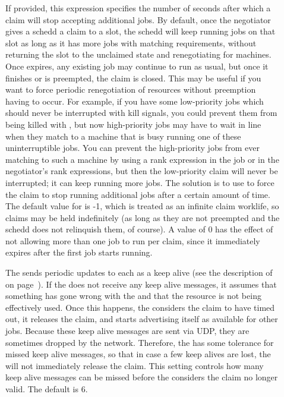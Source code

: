 \begin{description}
\item[] \label{param:ClaimWorklife} If
  provided, this expression specifies the number of seconds after
  which a claim will stop accepting additional jobs.  By default, once
  the negotiator gives a schedd a claim to a slot, the schedd will
  keep running jobs on that slot as long as it has more jobs with
  matching requirements, without returning the slot to the unclaimed
  state and renegotiating for machines.  Once 
  expires, any existing job may continue to run as usual, but once it
  finishes or is preempted, the claim is closed.
  This may be useful if you want to force periodic renegotiation of
  resources without preemption having to occur.  For example, if you
  have some low-priority jobs which should never be interrupted with
  kill signals, you could prevent them from being killed with
  , but now high-priority jobs may have to
  wait in line when they match to a machine that is busy running one of
  these uninterruptible jobs.  You can prevent the high-priority jobs
  from ever matching to such a machine by using a rank expression in the
  job or in the negotiator's rank expressions, but then the low-priority
  claim will never be interrupted; it can keep running more jobs.  The
  solution is to use  to force the claim to stop
  running additional jobs after a certain amount of time.
  The default value for  is -1, which is treated
  as an infinite claim worklife, so claims may be held indefinitely
  (as long as they are not preempted and the schedd does not
  relinquish them, of course).  A value of 0 has the effect of not allowing
  more than one job to run per claim, since it immediately expires after the
  first job starts running.

\item[]
  \label{param:MaxClaimAlivesMissed} The  sends periodic updates
  to each  as a keep alive (see the description of
   on page~\pageref{param:AliveInterval}).  
  If the  does not receive any keep alive messages, it assumes
  that something has gone wrong with the  and that the resource
  is not being effectively used.
  Once this happens, the  considers the claim to have timed out,
  it releases the claim, and starts advertising itself as available
  for other jobs.
  Because these keep alive messages are sent via UDP, they are
  sometimes dropped by the network.
  Therefore, the  has some tolerance for missed keep alive
  messages, so that in case a few keep alives are lost, the 
  will not immediately release the claim.
  This setting controls how many keep alive messages can be missed
  before the  considers the claim no longer valid.
  The default is 6.


\end{description}
